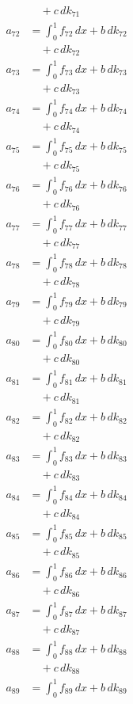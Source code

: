 \documentclass{article}
\begin{document}
\begin{align}
&\quad + c\,dk_{71} \\
a_{72} &= \int_0^1 f_{72}\,dx + b\,dk_{72} \\
&\quad + c\,dk_{72} \\
a_{73} &= \int_0^1 f_{73}\,dx + b\,dk_{73} \\
&\quad + c\,dk_{73} \\
a_{74} &= \int_0^1 f_{74}\,dx + b\,dk_{74} \\
&\quad + c\,dk_{74} \\
a_{75} &= \int_0^1 f_{75}\,dx + b\,dk_{75} \\
&\quad + c\,dk_{75} \\
a_{76} &= \int_0^1 f_{76}\,dx + b\,dk_{76} \\
&\quad + c\,dk_{76} \\
a_{77} &= \int_0^1 f_{77}\,dx + b\,dk_{77} \\
&\quad + c\,dk_{77} \\
a_{78} &= \int_0^1 f_{78}\,dx + b\,dk_{78} \\
&\quad + c\,dk_{78} \\
a_{79} &= \int_0^1 f_{79}\,dx + b\,dk_{79} \\
&\quad + c\,dk_{79} \\
a_{80} &= \int_0^1 f_{80}\,dx + b\,dk_{80} \\
&\quad + c\,dk_{80} \\
a_{81} &= \int_0^1 f_{81}\,dx + b\,dk_{81} \\
&\quad + c\,dk_{81} \\
a_{82} &= \int_0^1 f_{82}\,dx + b\,dk_{82} \\
&\quad + c\,dk_{82} \\
a_{83} &= \int_0^1 f_{83}\,dx + b\,dk_{83} \\
&\quad + c\,dk_{83} \\
a_{84} &= \int_0^1 f_{84}\,dx + b\,dk_{84} \\
&\quad + c\,dk_{84} \\
a_{85} &= \int_0^1 f_{85}\,dx + b\,dk_{85} \\
&\quad + c\,dk_{85} \\
a_{86} &= \int_0^1 f_{86}\,dx + b\,dk_{86} \\
&\quad + c\,dk_{86} \\
a_{87} &= \int_0^1 f_{87}\,dx + b\,dk_{87} \\
&\quad + c\,dk_{87} \\
a_{88} &= \int_0^1 f_{88}\,dx + b\,dk_{88} \\
&\quad + c\,dk_{88} \\
a_{89} &= \int_0^1 f_{89}\,dx + b\,dk_{89} \\

\end{align}
\end{document}
